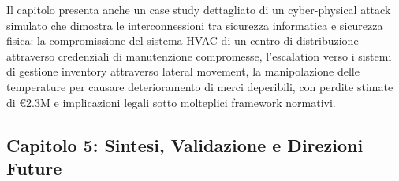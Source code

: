 Il capitolo presenta anche un case study dettagliato di un cyber-physical attack simulato che dimostra le interconnessioni tra sicurezza informatica e sicurezza fisica: la compromissione del sistema HVAC di un centro di distribuzione attraverso credenziali di manutenzione compromesse, l'escalation verso i sistemi di gestione inventory attraverso lateral movement, la manipolazione delle temperature per causare deterioramento di merci deperibili, con perdite stimate di €2.3M e implicazioni legali sotto molteplici framework normativi.

\subsection{Capitolo 5: Sintesi, Validazione e Direzioni Future}




      
      




